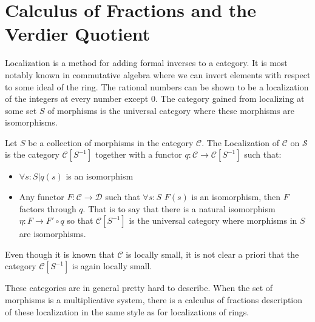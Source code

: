 \section{Calculus of Fractions and the Verdier Quotient}
     Localization is a method for adding formal inverses to a category. It is most notably known in commutative algebra where we can invert elements with respect to some ideal of the ring. The rational numbers can be shown to be a localization of the integers at every number except 0. The category gained from localizing at some set $S$ of morphisms is the universal category where these morphisms are isomorphisms.
    \begin{definition}
        Let $S$ be a collection of morphisms in the category $\mathcal{C}$. The Localization of $\mathcal{C}$ on $\mathcal{S}$ is the category $\mathcal{C}[S^{-1}]$ together with a functor $q:\mathcal{C}\rightarrow \mathcal{C}[S^{-1}]$ such that:
        \begin{itemize}
            \item $\forall s:S|q(s)$ is an isomorphism
            \item Any functor $F:\mathcal{C}\rightarrow\mathcal{D}$ such that $\forall s:S$ $F(s)$ is an isomorphism, then $F$ factors through $q$. That is to say that there is a natural isomorphism $\eta : F\rightarrow F'\circ q$ so that $\mathcal{C}[S^{-1}]$ is the universal category where morphisms in $S$ are isomorphisms.
        \end{itemize}
        \begin{center}
        \end{center}
    \end{definition}

    \begin{remark}
        Even though it is known that $\mathcal{C}$ is locally small, it is not clear a priori that the category $\mathcal{C}[S^{-1}]$ is again locally small.
    \end{remark}

     These categories are in general pretty hard to describe. When the set of morphisms is a multiplicative system, there is a calculus of fractions description of these localization in the same style as for localizations of rings.

